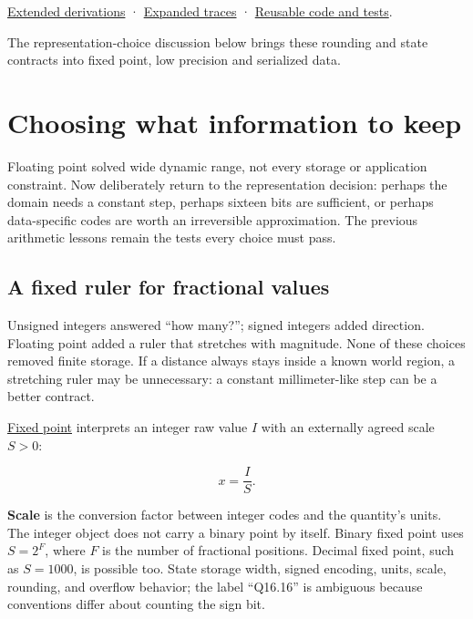 \hyperref[01-foundations-i-ch011-m005---representation-error-cancellation-and-rounding-graphs]{Extended derivations} · \hyperref[appendix-92ff77d4dfdc-m005---rounding-paths-and-update-history]{Expanded traces} · \hyperref[appendix-4e2236f53445-m005---strict-arithmetic-and-state-update-laboratory]{Reusable code and tests}.

The representation-choice discussion below brings these rounding and state contracts into fixed point, low precision and serialized data.

\section{Choosing what information to keep}\label{01-foundations-i-ch001-choosing-what-information-to-keep}

Floating point solved wide dynamic range, not every storage or application constraint. Now deliberately return to the representation decision: perhaps the domain needs a constant step, perhaps sixteen bits are sufficient, or perhaps data-specific codes are worth an irreversible approximation. The previous arithmetic lessons remain the tests every choice must pass.

\subsection{A fixed ruler for fractional values}\label{01-foundations-i-ch001-a-fixed-ruler-for-fractional-values}

Unsigned integers answered ``how many?''; signed integers added direction. Floating point added a ruler that stretches with magnitude. None of these choices removed finite storage. If a distance always stays inside a known world region, a stretching ruler may be unnecessary: a constant millimeter-like step can be a better contract.

\hyperref[appendix-1d0dbe8924cc]{Fixed point} interprets an integer raw value \(I\) with an externally agreed scale \(S>0\):

\[
x=\frac{I}{S}.
\]

\textbf{Scale} is the conversion factor between integer codes and the quantity's units. The integer object does not carry a binary point by itself. Binary fixed point uses \(S=2^F\), where \(F\) is the number of fractional positions. Decimal fixed point, such as \(S=1000\), is possible too. State storage width, signed encoding, units, scale, rounding, and overflow behavior; the label ``Q16.16'' is ambiguous because conventions differ about counting the sign bit.

